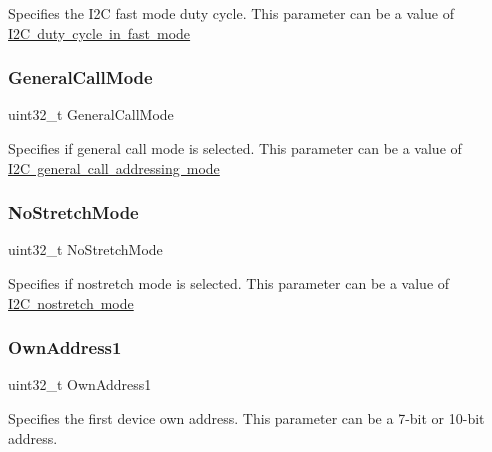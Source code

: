 Specifies the I2C fast mode duty cycle. This parameter can be a value of \mbox{\hyperlink{group___i2_c__duty__cycle__in__fast__mode}{I2C duty cycle in fast mode}} \mbox{\label{struct_i2_c___init_type_def_afc70f58c0935194064d720779fbf22b5}} 
\subsubsection{\texorpdfstring{General\+Call\+Mode}{GeneralCallMode}}
{\footnotesize\ttfamily uint32\+\_\+t General\+Call\+Mode}

Specifies if general call mode is selected. This parameter can be a value of \mbox{\hyperlink{group___i2_c__general__call__addressing__mode}{I2C general call addressing mode}} \mbox{\label{struct_i2_c___init_type_def_a47971fd08a9784eddaa3d83fb998030c}} 
\subsubsection{\texorpdfstring{No\+Stretch\+Mode}{NoStretchMode}}
{\footnotesize\ttfamily uint32\+\_\+t No\+Stretch\+Mode}

Specifies if nostretch mode is selected. This parameter can be a value of \mbox{\hyperlink{group___i2_c__nostretch__mode}{I2C nostretch mode}} \mbox{\label{struct_i2_c___init_type_def_a8abec5c168e27bf11b2808c1450bdeda}} 
\subsubsection{\texorpdfstring{Own\+Address1}{OwnAddress1}}
{\footnotesize\ttfamily uint32\+\_\+t Own\+Address1}

Specifies the first device own address. This parameter can be a 7-\/bit or 10-\/bit address. \mbox{\label{struct_i2_c___init_type_def_a6300c7a7e1b7d5444226a1bd55744f53}} 
